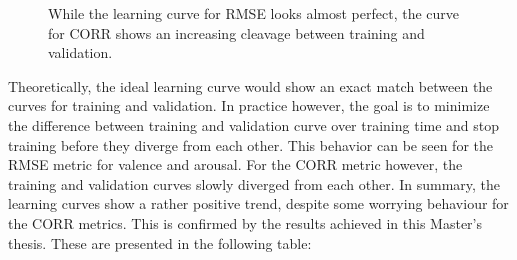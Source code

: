 \begin{figure}[H]
  \centering
  \hfill
  \caption{While the learning curve for RMSE looks almost perfect, the curve for CORR shows an increasing cleavage between training and validation.}
\end{figure}

Theoretically, the ideal learning curve would show an exact match between the curves for training and validation. In practice however, the goal is to minimize the difference between training and validation curve over training time and stop training before they diverge from each other. This behavior can be seen for the RMSE metric for valence and arousal. For the CORR metric however, the training and validation curves slowly diverged from each other.
\newline\newline
In summary, the learning curves show a rather positive trend, despite some worrying behaviour for the CORR metrics. This is confirmed by the results achieved in this Master's thesis. These are presented in the following table:

